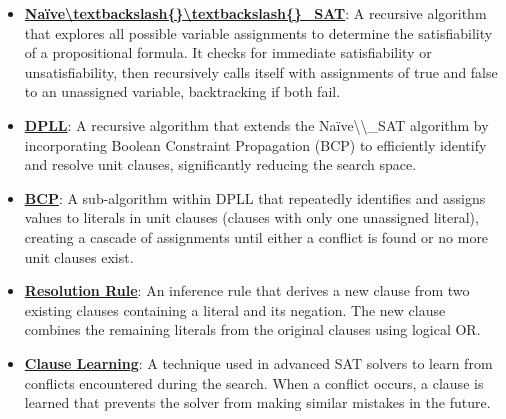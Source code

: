 \documentclass{article}%
\begin{document}
\begin{itemize}[leftmargin=*]%
\item \href{https://purdue.brightspace.com/d2l/common/assets/pdfjs-d2l-dist/1.0.14-legacy/web/viewer.html?file=\%2Fcontent\%2Fenforced\%2F1095467-wl.202510.CS.24300.001\%2F15L2-SAT.pdf\%3Fou\%3D1095467\&lang=en-us\&container=d2l-fileviewer-rendered-pdf\&fullscreen=d2l-fileviewer-rendered-pdf-dialog\&height=667#page=18}{\textbf{Naïve\textbackslash{}textbackslash\{\}\textbackslash{}textbackslash\{\}\_SAT}}: A recursive algorithm that explores all possible variable assignments to determine the satisfiability of a propositional formula. It checks for immediate satisfiability or unsatisfiability, then recursively calls itself with assignments of true and false to an unassigned variable, backtracking if both fail.%
\item \href{https://purdue.brightspace.com/d2l/common/assets/pdfjs-d2l-dist/1.0.14-legacy/web/viewer.html?file=\%2Fcontent\%2Fenforced\%2F1095467-wl.202510.CS.24300.001\%2F15L2-SAT.pdf\%3Fou\%3D1095467\&lang=en-us\&container=d2l-fileviewer-rendered-pdf\&fullscreen=d2l-fileviewer-rendered-pdf-dialog\&height=667#page=17}{\textbf{DPLL}}: A recursive algorithm that extends the Naïve\textbackslash{}\textbackslash{}_SAT algorithm by incorporating Boolean Constraint Propagation (BCP) to efficiently identify and resolve unit clauses, significantly reducing the search space.%
\item \href{https://purdue.brightspace.com/d2l/common/assets/pdfjs-d2l-dist/1.0.14-legacy/web/viewer.html?file=\%2Fcontent\%2Fenforced\%2F1095467-wl.202510.CS.24300.001\%2F15L2-SAT.pdf\%3Fou\%3D1095467\&lang=en-us\&container=d2l-fileviewer-rendered-pdf\&fullscreen=d2l-fileviewer-rendered-pdf-dialog\&height=667#page=20}{\textbf{BCP}}: A sub-algorithm within DPLL that repeatedly identifies and assigns values to literals in unit clauses (clauses with only one unassigned literal), creating a cascade of assignments until either a conflict is found or no more unit clauses exist.%
\item \href{https://purdue.brightspace.com/d2l/common/assets/pdfjs-d2l-dist/1.0.14-legacy/web/viewer.html?file=\%2Fcontent\%2Fenforced\%2F1095467-wl.202510.CS.24300.001\%2F15L2-SAT.pdf\%3Fou\%3D1095467\&lang=en-us\&container=d2l-fileviewer-rendered-pdf\&fullscreen=d2l-fileviewer-rendered-pdf-dialog\&height=667#page=32}{\textbf{Resolution Rule}}: An inference rule that derives a new clause from two existing clauses containing a literal and its negation. The new clause combines the remaining literals from the original clauses using logical OR.%
\item \href{https://purdue.brightspace.com/d2l/common/assets/pdfjs-d2l-dist/1.0.14-legacy/web/viewer.html?file=\%2Fcontent\%2Fenforced\%2F1095467-wl.202510.CS.24300.001\%2F15L2-SAT.pdf\%3Fou\%3D1095467\&lang=en-us\&container=d2l-fileviewer-rendered-pdf\&fullscreen=d2l-fileviewer-rendered-pdf-dialog\&height=667#page=35}{\textbf{Clause Learning}}: A technique used in advanced SAT solvers to learn from conflicts encountered during the search. When a conflict occurs, a clause is learned that prevents the solver from making similar mistakes in the future.%
\end{itemize}%
\end{document}
